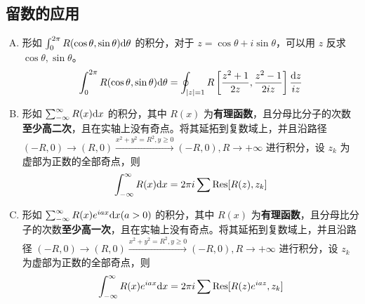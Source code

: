 \documentclass[./main.tex]{subfiles}
\begin{document}
\subsection{留数的应用}
\begin{enumerate}[(A)]
    \item 形如 $\int_0^{2\pi}R(\cos\theta,\sin\theta)\text{d}\theta$ 的积分，对于 $z=\cos\theta+i\sin\theta$，可以用 $z$ 反求 $\cos\theta,\sin\theta$。
    \begin{equation}
        \int_0^{2\pi}R(\cos\theta,\sin\theta)\text{d}\theta=\oint_{|z|=1}R\left[\frac{z^2+1}{2z},\frac{z^2-1}{2iz}\right]\frac{\text{d}z}{iz}
    \end{equation}
    \item 形如 $\sum_{-\infty}^{\infty}R(x)\text{d}x$ 的积分，其中 $R(x)$ 为\textbf{有理函数}，且分母比分子的次数\textbf{至少高二次}，且在实轴上没有奇点。将其延拓到复数域上，并且沿路径 $(-R,0)\rightarrow(R,0)\xrightarrow{x^2+y^2=R^2,y\ge 0}(-R,0),R\rightarrow+\infty$ 进行积分，设 $z_k$ 为虚部为正数的全部奇点，则
    \begin{equation}
        \int_{-\infty}^{\infty}R(x)\text{d}x=2\pi i\sum\text{Res}[R(z),z_k]
    \end{equation}
    \item 形如 $\sum_{-\infty}^{\infty}R(x)e^{iax}\text{d}x(a>0)$ 的积分，其中 $R(x)$ 为\textbf{有理函数}，且分母比分子的次数\textbf{至少高一次}，且在实轴上没有奇点。将其延拓到复数域上，并且沿路径 $(-R,0)\rightarrow(R,0)\xrightarrow{x^2+y^2=R^2,y\ge 0}(-R,0),R\rightarrow+\infty$ 进行积分，设 $z_k$ 为虚部为正数的全部奇点，则
    \begin{equation}
        \int_{-\infty}^{\infty}R(x)e^{iax}\text{d}x=2\pi i\sum\text{Res}[R(z)e^{iaz},z_k]
    \end{equation}
\end{enumerate}
\end{document}
